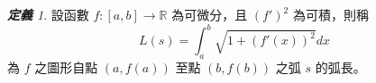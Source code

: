 \documentclass[12pt]{article}
\theoremstyle{remark}
\newtheorem{cdefi}{\bfseries 定義}
\begin{document}
\begin{cdefi}
設函數 $f:[a,b]\rightarrow{\mathbb R}$ 為可微分，且 $(f')^2$ 為可積，則稱
\[
L(s)=\int^b_a\sqrt{1+(f'(x))^2}dx
\]
為 $f$ 之圖形自點 $(a,f(a))$ 至點 $(b,f(b))$ 之弧 $s$ 的弧長。
\end{cdefi}
\end{document}
